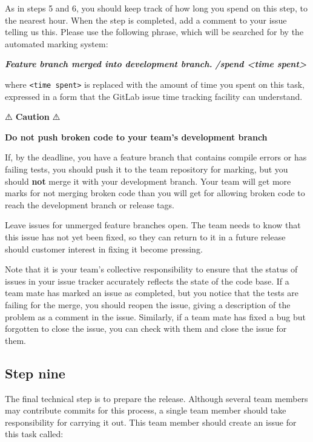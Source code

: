 \documentclass[
]{book}
\newenvironment{Shaded}{\begin{snugshade}}{\end{snugshade}}
\newcommand{\InformationTok}[1]{\textcolor[rgb]{0.56,0.35,0.01}{\textbf{\textit{#1}}}}
\begin{document}
As in steps 5 and 6, you should keep track of how long you spend on this step, to the nearest hour. When the step is completed, add a comment to your issue telling us this. Please use the following phrase, which will be searched for by the automated marking system:

\begin{Shaded}
\begin{Highlighting}[]
\InformationTok{    Feature branch merged into development branch.}
\InformationTok{    /spend \textless{}time spent\textgreater{}}
\end{Highlighting}
\end{Shaded}

where \texttt{\textless{}time\ spent\textgreater{}} is replaced with the amount of time you spent on this task, expressed in a form that the GitLab issue time tracking facility can understand.

⚠️ \textbf{Caution} ⚠️

\textbf{Do not push broken code to your team's development branch}

If, by the deadline, you have a feature branch that contains compile errors or has failing tests, you should push it to the team repository for marking, but you should \textbf{not} merge it with your development branch. Your team will get more marks for not merging broken code than you will get for allowing broken code to reach the development branch or release tags.

Leave issues for unmerged feature branches open. The team needs to know that this issue has not yet been fixed, so they can return to it in a future release should customer interest in fixing it become pressing.

Note that it is your team's collective responsibility to ensure that the status of issues in your issue tracker accurately reflects the state of the code base. If a team mate has marked an issue as completed, but you notice that the tests are failing for the merge, you should reopen the issue, giving a description of the problem as a comment in the issue. Similarly, if a team mate has fixed a bug but forgotten to close the issue, you can check with them and close the issue for them.

\hypertarget{stepnine}{%
\subsection{Step nine}\label{stepnine}}

The final technical step is to prepare the release. Although several team members may contribute commits for this process, a single team member should take responsibility for carrying it out. This team member should create an issue for this task called:
\end{document}
